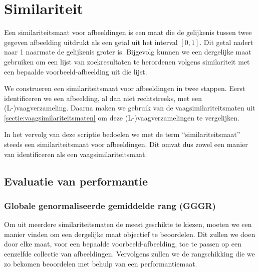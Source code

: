 \chapter{Similariteit}

Een similariteitsmaat voor afbeeldingen is een maat die de gelijkenis tussen twee gegeven
afbeelding uitdrukt als een getal uit het interval $[0,1]$. Dit getal nadert naar 1
naarmate de gelijkenis groter is. Bijgevolg kunnen we een dergelijke maat gebruiken om
een lijst van zoekresultaten te herordenen volgens similariteit met een bepaalde 
voorbeeld-afbeelding uit die lijst. 

We construeren een similariteitsmaat voor afbeeldingen in twee stappen. Eerst identificeren we
een afbeelding, al dan niet rechtstreeks, met een (L-)vaagverzameling. Daarna maken we gebruik van
de vaagsimilariteitsmaten uit \ref{sectie:vaagsimilariteitsmaten} om deze (L-)vaagverzamelingen te
vergelijken. 

In het vervolg van deze scriptie bedoelen we met de term ``similariteitsmaat'' steeds
een similariteitsmaat voor afbeeldingen. Dit omvat dus zowel een manier van identificeren als een 
vaagsimilariteitsmaat.

\section{Evaluatie van performantie}

\subsection{Globale genormaliseerde gemiddelde rang (GGGR)}

Om uit meerdere similariteitsmaten de meest geschikte te kiezen, 
moeten we een manier vinden om een dergelijke maat objectief te beoordelen. 
Dit zullen we doen door elke
maat, voor een bepaalde voorbeeld-afbeelding, toe te passen op een eenzelfde collectie 
van afbeeldingen. Vervolgens zullen we de rangschikking die we zo bekomen
beoordelen met behulp van een performantiemaat.

